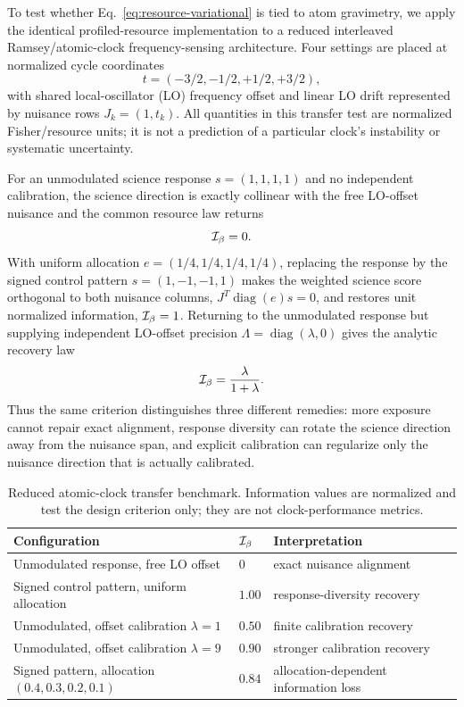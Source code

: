 To test whether Eq.~\eqref{eq:resource-variational} is tied to atom gravimetry, we apply the identical profiled-resource implementation to a reduced interleaved Ramsey/atomic-clock frequency-sensing architecture. Four settings are placed at normalized cycle coordinates
\begin{equation}
t=(-3/2,-1/2,+1/2,+3/2),
\end{equation}
with shared local-oscillator (LO) frequency offset and linear LO drift represented by nuisance rows $J_k=(1,t_k)$. All quantities in this transfer test are normalized Fisher/resource units; it is not a prediction of a particular clock's instability or systematic uncertainty.

For an unmodulated science response $s=(1,1,1,1)$ and no independent calibration, the science direction is exactly collinear with the free LO-offset nuisance and the common resource law returns
\begin{equation}
\mathcal I_{\beta}=0.
\end{equation}
With uniform allocation $e=(1/4,1/4,1/4,1/4)$, replacing the response by the signed control pattern $s=(1,-1,-1,1)$ makes the weighted science score orthogonal to both nuisance columns, $J^T\operatorname{diag}(e)s=0$, and restores unit normalized information, $\mathcal I_{\beta}=1$. Returning to the unmodulated response but supplying independent LO-offset precision $\Lambda=\operatorname{diag}(\lambda,0)$ gives the analytic recovery law
\begin{equation}
\mathcal I_{\beta}=\frac{\lambda}{1+\lambda}.
\label{eq:clock-calibration-law}
\end{equation}
Thus the same criterion distinguishes three different remedies: more exposure cannot repair exact alignment, response diversity can rotate the science direction away from the nuisance span, and explicit calibration can regularize only the nuisance direction that is actually calibrated.

\begin{table}[t]
\caption{Reduced atomic-clock transfer benchmark. Information values are normalized and test the design criterion only; they are not clock-performance metrics.}
\label{tab:clock-transfer}
\small
\begin{tabular}{p{}p{}p{}}
\toprule
Configuration & $\mathcal I_{\beta}$ & Interpretation\\
\midrule
Unmodulated response, free LO offset & $0$ & exact nuisance alignment\\
Signed control pattern, uniform allocation & $1.00$ & response-diversity recovery\\
Unmodulated, offset calibration $\lambda=1$ & $0.50$ & finite calibration recovery\\
Unmodulated, offset calibration $\lambda=9$ & $0.90$ & stronger calibration recovery\\
Signed pattern, allocation $(0.4,0.3,0.2,0.1)$ & $0.84$ & allocation-dependent information loss\\
\bottomrule
\end{tabular}
\normalsize
\end{table}

